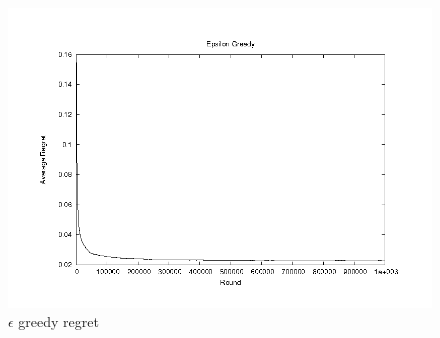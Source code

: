 \documentclass{article}
\begin{document}
\newcommand{\figwidth}{5in}


\begin{figure}[h!]
  \begin{center}
    \includegraphics[width=\figwidth]{images/e_greed.png}
     \caption{$\epsilon$ greedy regret}
     \label{fig:egreed}
  \end{center}
\end{figure}
\end{document}
